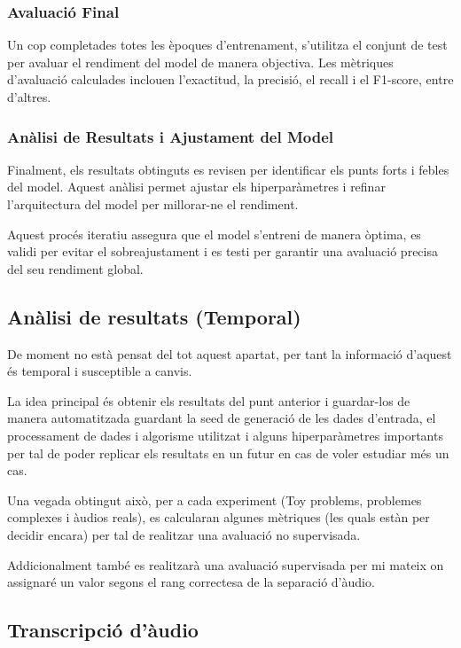 \documentclass[10pt,a4paper,twocolumn,twoside]{article}
\begin{document}
\subsubsection{Avaluació Final}

Un cop completades totes les èpoques d'entrenament, s'utilitza el conjunt de test per avaluar el rendiment del model de manera objectiva. Les mètriques d'avaluació calculades inclouen l'exactitud, la precisió, el recall i el F1-score, entre d'altres.

\subsubsection{Anàlisi de Resultats i Ajustament del Model}

Finalment, els resultats obtinguts es revisen per identificar els punts forts i febles del model. Aquest anàlisi permet ajustar els hiperparàmetres i refinar l'arquitectura del model per millorar-ne el rendiment.

Aquest procés iteratiu assegura que el model s'entreni de manera òptima, es validi per evitar el sobreajustament i es testi per garantir una avaluació precisa del seu rendiment global.


\subsection{Anàlisi de resultats (Temporal)}

De moment no està pensat del tot aquest apartat, per tant la informació d'aquest és temporal i susceptible a canvis.

La idea principal és obtenir els resultats del punt anterior i guardar-los de manera automatitzada guardant la seed de generació de les dades d'entrada, el processament de dades i algorisme utilitzat i alguns hiperparàmetres importants per tal de poder replicar els resultats en un futur en cas de voler estudiar més un cas.

Una vegada obtingut això, per a cada experiment (Toy problems, problemes complexes i àudios reals), es calcularan algunes mètriques (les quals estàn per decidir encara) per tal de realitzar una avaluació no supervisada.

Addicionalment també es realitzarà una avaluació supervisada per mi mateix on assignaré un valor segons el rang correctesa de la separació d'àudio.

\subsection{Transcripció d'àudio}
\end{document}
